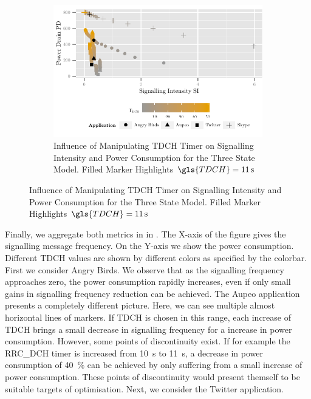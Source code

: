 \begin{figure}
	\begin{subfigure}[b]{\textwidth}
	\centering
	\includegraphics{network/network_traces/numerical_results/figures/3_state_signalling_vs_power_consumption}
	\caption{Influence of Manipulating \gls{TDCH} Timer on Signalling Intensity and Power Consumption for the Three State Model. Filled Marker Highlights \(\gls{TDCH} = \SI{11}{\second}\)}\label{fig:network:network_traces:numerical_results:three_states:trade_off}
	\end{subfigure}
\end{figure}
Finally, we aggregate both metrics in in .
The X-axis of the figure gives the signalling message frequency.
On the Y-axis we show the power consumption.
Different \gls{TDCH} values are shown by different colors as specified by the colorbar.
First we consider Angry Birds.
We observe that as the signalling frequency approaches zero, the power consumption rapidly increases, even if only small gains in signalling frequency reduction can be achieved.
The Aupeo application presents a completely different picture.
Here, we can see multiple almost horizontal lines of markers.
If \gls{TDCH} is chosen in this range, each increase of \gls{TDCH} brings a small decrease  in signalling frequency for a increase in power consumption.
However, some points of discontinuity exist.
If for example the \gls{RRC_DCH} timer is increased from \SI{10}{\second} to \SI{11}{\second}, a decrease in power consumption of \SI{40}{\percent} can be achieved by only suffering from a small increase of power consumption.
These points of discontinuity would present themself to be suitable targets of optimisation.
Next, we consider the Twitter application.
